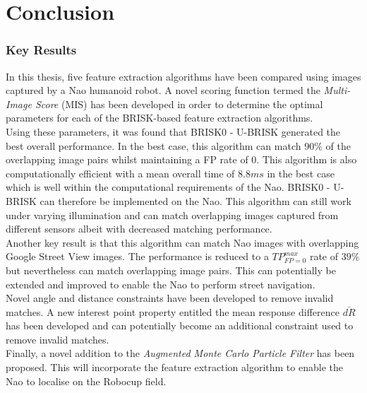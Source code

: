 \chapter{Conclusion}
\label{sec:Conclusion}



\subsection{Key Results}
\label{sec:keyResults}
In this thesis, five feature extraction algorithms have been compared using images captured by a Nao humanoid robot. A novel scoring function termed the \textit{Multi-Image Score} (MIS) has been developed in order to determine the optimal parameters for each  of the BRISK-based feature extraction algorithms.\\

Using these parameters, it was found that BRISK0 - U-BRISK generated the best overall performance. In the best case, this algorithm can match $90\%$ of the overlapping image pairs whilst maintaining a FP rate of $0$. This algorithm is also computationally efficient with a mean overall time of $8.8 ms$ in the best case which is well within the computational requirements of the Nao. BRISK0 - U-BRISK can therefore be implemented on the Nao. This algorithm can still work under varying illumination and can match overlapping images captured from different sensors albeit with decreased matching performance.\\

Another key result is that this algorithm can match Nao images with overlapping Google Street View images. The performance is reduced to a $TP_{FP=0}^{max}$ rate of $39\%$ but nevertheless can match overlapping image pairs. This can potentially be extended and improved to enable the Nao to perform street navigation.\\

Novel angle and distance constraints have been developed to remove invalid matches. A new interest point property entitled the mean response difference $\bar{dR}$ has been developed and can potentially become an additional constraint used to remove invalid matches.\\

Finally, a novel addition to the \textit{Augmented Monte Carlo Particle Filter} has been proposed. This will incorporate the feature extraction algorithm to enable the Nao to localise on the Robocup field.\\




